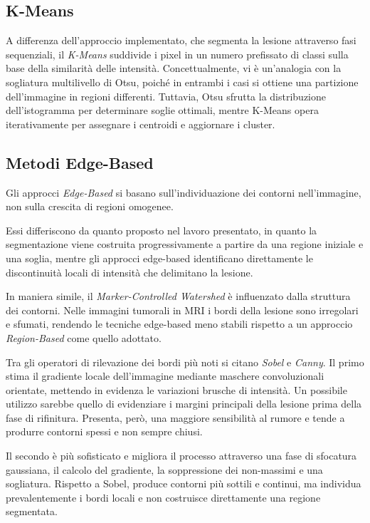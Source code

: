 \subsection{K-Means}
A differenza dell’approccio implementato, che segmenta la lesione attraverso fasi sequenziali, il \textit{K-Means} suddivide i pixel in un numero prefissato di classi sulla base della similarità delle intensità. Concettualmente, vi è un’analogia con la sogliatura multilivello di Otsu, poiché in entrambi i casi si ottiene una partizione dell’immagine in regioni differenti. Tuttavia, Otsu sfrutta la distribuzione dell’istogramma per determinare soglie ottimali, mentre K-Means opera iterativamente per assegnare i centroidi e aggiornare i cluster.

\subsection{Metodi Edge-Based}
Gli approcci \textit{Edge-Based} si basano sull’individuazione dei contorni nell'immagine, non sulla crescita di regioni omogenee.

Essi differiscono da quanto proposto nel lavoro presentato, in quanto la segmentazione viene costruita progressivamente a partire da una regione iniziale e una soglia, mentre gli approcci edge-based identificano direttamente le discontinuità locali di intensità che delimitano la lesione.

In maniera simile, il \textit{Marker-Controlled Watershed} è influenzato dalla struttura dei contorni. Nelle immagini tumorali in MRI i bordi della lesione sono irregolari e sfumati, rendendo le tecniche edge-based meno stabili rispetto a un approccio \textit{Region-Based} come quello adottato.

Tra gli operatori di rilevazione dei bordi più noti si citano \textit{Sobel} e \textit{Canny}. Il primo stima il gradiente locale dell’immagine mediante maschere convoluzionali orientate, mettendo in evidenza le variazioni brusche di intensità. Un possibile utilizzo sarebbe quello di evidenziare i margini principali della lesione prima della fase di rifinitura. Presenta, però, una maggiore sensibilità al rumore e tende a produrre contorni spessi e non sempre chiusi.

Il secondo è più sofisticato e migliora il processo attraverso una fase di sfocatura gaussiana, il calcolo del gradiente, la soppressione dei non-massimi e una sogliatura. Rispetto a Sobel, produce contorni più sottili e continui, ma individua prevalentemente i bordi locali e non costruisce direttamente una regione segmentata.